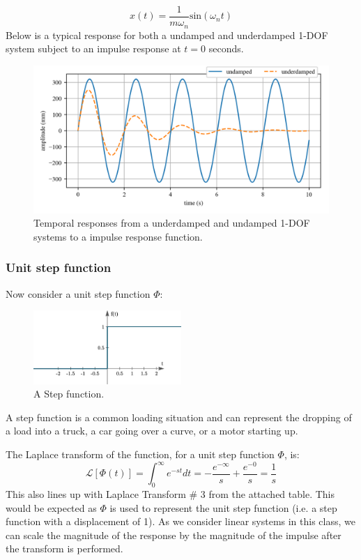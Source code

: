 \documentclass[12pt,letter]{article}
\numberwithin{ex}{section} %
\numberwithin{re}{section} %
\newcommand{\Laplace}[1]{\ensuremath{\mathcal{L}{\left[#1\right]}}}
\begin{document}
\begin{equation}
x(t) = \frac{1}{m \omega_n}\text{sin}(\omega_n t)
\end{equation}
Below is a typical response for both a undamped and underdamped 1-DOF system subject to an impulse response at $t=0$ seconds. 
\begin{figure}[H]
	\centering
	\includegraphics[]{../figures/response_impulse.png}
	\caption{Temporal responses from a underdamped and undamped 1-DOF systems to a impulse response function.}
\end{figure}



\subsubsection{Unit step function}
Now consider a unit step function $\Phi$: 

\begin{figure}[H]
	\centering
	\includegraphics[width=0.5\textwidth]{../figures/unit_step_function.png}
	\caption{A Step function. }
\end{figure}

A step function is a common loading situation and can represent the dropping of a load into a truck, a car going over a curve, or a motor starting up. 


The Laplace transform of the function, for a unit step function $\Phi$, is: 
\begin{equation*}
\Laplace{\Phi(t)} = \int_{0}^{\infty} e^{-st}dt = -\frac{e^{-\infty}}{s} +\frac{e^{-0}}{s} =\frac{1}{s}
\end{equation*}
This also lines up with Laplace Transform \# 3 from the attached table. This would be expected as $\Phi$ is used to represent the unit step function (i.e. a step function with a displacement of 1). As we consider linear systems in this class, we can scale the magnitude of the response by the magnitude of the impulse after the transform is performed. 
\end{document}

